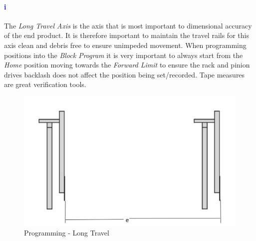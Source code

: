 \paragraph{\textbf{\LARGE \textcolor{blue}{i}}}The \textit{Long Travel Axis} is the axis that is most important to dimensional accuracy of the end product. It is therefore important to maintain the travel rails for this axis clean and debris free to ensure unimpeded movement. When programming positions into the \textit{Block Program} it is very important to always start from the \textit{Home} position moving towards the \textit{Forward Limit} to ensure the rack and pinion drives backlash does not affect the position being set/recorded. Tape measures are great verification tools.
\begin{figure}
	\centering
	\includegraphics[width=0.5\linewidth]{screen-captures/program/kodiak-saw-long-travel}
	\caption{Programming - Long Travel}
	\label{fig:prg-long-travel}
\end{figure}